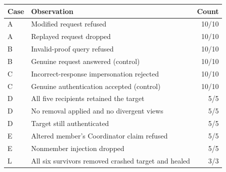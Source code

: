 \begin{tabular}{>{\raggedright\arraybackslash}p{}>{\raggedright\arraybackslash}p{}r}
\hline
\textbf{Case} & \textbf{Observation} & \textbf{Count} \\
\hline
A & Modified request refused & 10/10 \\
A & Replayed request dropped & 10/10 \\
B & Invalid-proof query refused & 10/10 \\
B & Genuine request answered (control) & 10/10 \\
C & Incorrect-response impersonation rejected & 10/10 \\
C & Genuine authentication accepted (control) & 10/10 \\
D & All five recipients retained the target & 5/5 \\
D & No removal applied and no divergent views & 5/5 \\
D & Target still authenticated & 5/5 \\
E & Altered member's Coordinator claim refused & 5/5 \\
E & Nonmember injection dropped & 5/5 \\
L & All six survivors removed crashed target and healed & 3/3 \\
\hline
\end{tabular}
